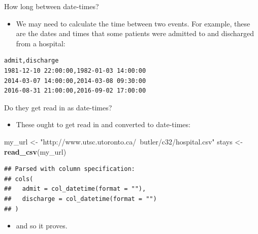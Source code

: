 \documentclass[ignorenonframetext,]{beamer}
\newenvironment{Shaded}{\begin{snugshade}}{\end{snugshade}}
\newcommand{\KeywordTok}[1]{\textcolor[rgb]{0.13,0.29,0.53}{\textbf{#1}}}
\newcommand{\NormalTok}[1]{#1}
\newcommand{\StringTok}[1]{\textcolor[rgb]{0.31,0.60,0.02}{#1}}
\providecommand{\tightlist}{%
  \setlength{\itemsep}{0pt}\setlength{\parskip}{0pt}}
\begin{document}
\begin{frame}[fragile]{How long between date-times?}
\protect\hypertarget{how-long-between-date-times}{}

\begin{itemize}
\tightlist
\item
  We may need to calculate the time between two events. For example,
  these are the dates and times that some patients were admitted to and
  discharged from a hospital:
\end{itemize}

\begin{verbatim}
admit,discharge
1981-12-10 22:00:00,1982-01-03 14:00:00
2014-03-07 14:00:00,2014-03-08 09:30:00
2016-08-31 21:00:00,2016-09-02 17:00:00
\end{verbatim}

\end{frame}

\begin{frame}[fragile]{Do they get read in as date-times?}
\protect\hypertarget{do-they-get-read-in-as-date-times}{}

\begin{itemize}
\tightlist
\item
  These ought to get read in and converted to date-times:
\end{itemize}

\begin{Shaded}
\begin{Highlighting}[]
\NormalTok{my_url <-}\StringTok{ "http://www.utsc.utoronto.ca/~butler/c32/hospital.csv"}
\NormalTok{stays <-}\StringTok{ }\KeywordTok{read_csv}\NormalTok{(my_url)}
\end{Highlighting}
\end{Shaded}

\begin{verbatim}
## Parsed with column specification:
## cols(
##   admit = col_datetime(format = ""),
##   discharge = col_datetime(format = "")
## )
\end{verbatim}

\begin{itemize}
\tightlist
\item
  and so it proves.
\end{itemize}

\end{frame}
\end{document}
